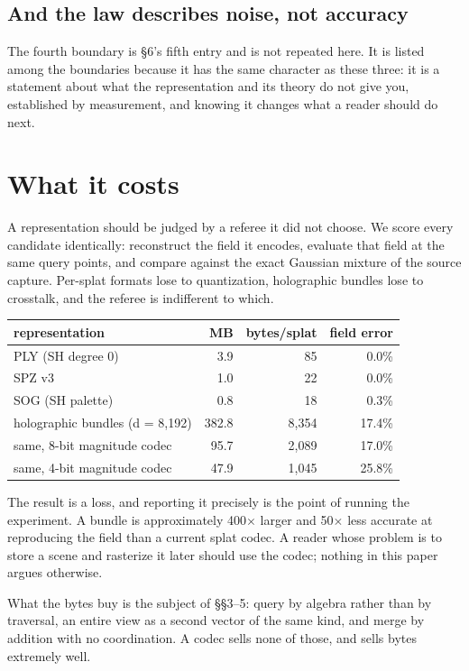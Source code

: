 \documentclass[11pt]{article}
\begin{document}
\subsection{And the law describes noise, not accuracy}

The fourth boundary is \S6's fifth entry and is not repeated here. It is
listed among the boundaries because it has the same character as these
three: it is a statement about what the representation and its theory do
not give you, established by measurement, and knowing it changes what a
reader should do next.

\section{What it costs}

A representation should be judged by a referee it did not choose. We
score every candidate identically: reconstruct the field it encodes,
evaluate that field at the same query points, and compare against the
exact Gaussian mixture of the source capture. Per-splat formats lose to
quantization, holographic bundles lose to crosstalk, and the referee is
indifferent to which.

\begin{table}[htbp]
\centering
\begin{tabular}{lrrr}
\toprule
representation & MB & bytes/splat & field error \\
\midrule
PLY (SH degree 0) & 3.9 & 85 & 0.0\% \\
SPZ v3 & 1.0 & 22 & 0.0\% \\
SOG (SH palette) & 0.8 & 18 & 0.3\% \\
holographic bundles (d = 8,192) & 382.8 & 8,354 & 17.4\% \\
same, 8-bit magnitude codec & 95.7 & 2,089 & 17.0\% \\
same, 4-bit magnitude codec & 47.9 & 1,045 & 25.8\% \\
\bottomrule
\end{tabular}
\end{table}

The result is a loss, and reporting it precisely is the point of running
the experiment. A bundle is approximately 400$\times$ larger and
50$\times$ less accurate at reproducing the field than a current splat
codec. A reader whose problem is to store a scene and rasterize it later
should use the codec; nothing in this paper argues otherwise.

What the bytes buy is the subject of \S\S3--5: query by algebra rather
than by traversal, an entire view as a second vector of the same kind,
and merge by addition with no coordination. A codec sells none of those,
and sells bytes extremely well.
\end{document}
